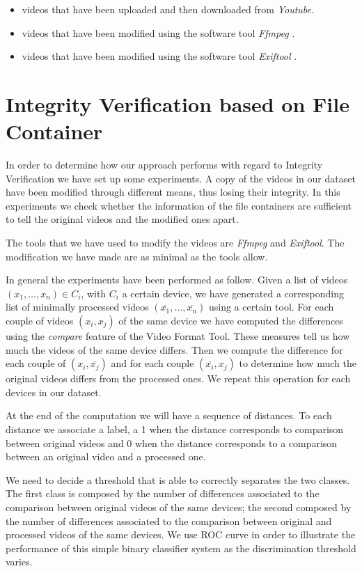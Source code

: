 \begin{itemize}
\item videos that have been uploaded and then downloaded from 	\emph{Youtube}.
\item videos that have been modified using the software tool \emph{Ffmpeg} \cite{}.
\item videos that have been modified using the software tool \emph{Exiftool} \cite{}.
\end{itemize}

\section{Integrity Verification based on File Container}

In order to determine how our approach performs with regard to Integrity Verification we have set up some experiments. A copy of the videos in our dataset have been modified through different means, thus losing their integrity. In this experiments we check whether the information of the file containers are sufficient to tell the original videos and the modified ones apart.

The tools that we have used to modify the videos are \emph{Ffmpeg} and \emph{Exiftool}. The modification we have made are as minimal as the tools allow.

In general the experiments have been performed as follow. Given a list of videos $(x_{1},\ldots,x_{n}) \in C_{i}$, with $C_{i}$ a certain device, we have generated a corresponding list of minimally processed videos $(\overline{x_{1}},\ldots,\overline{x_{n}})$ using a certain tool. For each couple of videos $(x_{i}, x_{j})$ of the same device we have computed the differences using the \emph{compare} feature of the Video Format Tool. These measures tell us how much the videos of the same device differs. Then we compute the difference for each couple of $(x_{i}, \overline{x_{j}})$ and for each couple $(\overline{x_{i}}, x_{j})$ to determine how much the original videos differs from the processed ones. We repeat this operation for each devices in our dataset.

At the end of the computation we will have a sequence of distances. To each distance we associate a label, a 1 when the distance corresponds to comparison between original videos and 0 when the distance corresponds to a comparison between an original video and a processed one.

We need to decide a threshold that is able to correctly separates the two classes. The first class is composed by the number of differences associated to the comparison between original videos of the same devices; the second composed by the number of differences associated to the comparison between original and processed videos of the same devices. We use ROC curve in order to illustrate the performance of this simple binary classifier system as the discrimination threshold varies.

